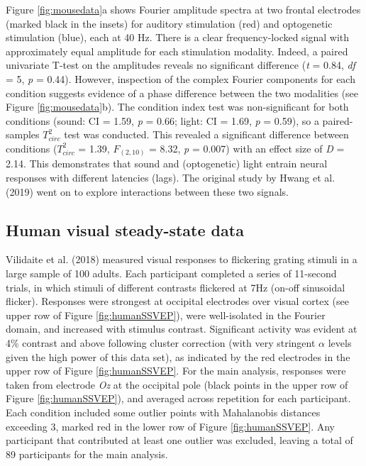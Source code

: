 \documentclass[]{article}
\begin{document}
Figure \ref{fig:mousedata}a shows Fourier amplitude spectra at two frontal electrodes (marked black in the insets) for auditory stimulation (red) and optogenetic stimulation (blue), each at 40 Hz. There is a clear frequency-locked signal with approximately equal amplitude for each stimulation modality. Indeed, a paired univariate T-test on the amplitudes reveals no significant difference (\emph{t} = 0.84, \emph{df} = 5, \emph{p} = 0.44). However, inspection of the complex Fourier components for each condition suggests evidence of a phase difference between the two modalities (see Figure \ref{fig:mousedata}b). The condition index test was non-significant for both conditions (sound: CI = 1.59, \emph{p} = 0.66; light: CI = 1.69, \emph{p} = 0.59), so a paired-samples \(T^2_{circ}\) test was conducted. This revealed a significant difference between conditions (\(T^2_{circ}\) = 1.39, \(F_{(2,10)}\) = 8.32, \emph{p} = 0.007) with an effect size of \emph{D} = 2.14. This demonstrates that sound and (optogenetic) light entrain neural responses with different latencies (lags). The original study by Hwang et al. (2019) went on to explore interactions between these two signals.

\hypertarget{human-visual-steady-state-data}{%
\subsection{Human visual steady-state data}\label{human-visual-steady-state-data}}

Vilidaite et al. (2018) measured visual responses to flickering grating stimuli in a large sample of 100 adults. Each participant completed a series of 11-second trials, in which stimuli of different contrasts flickered at 7Hz (on-off sinusoidal flicker). Responses were strongest at occipital electrodes over visual cortex (see upper row of Figure \ref{fig:humanSSVEP}), were well-isolated in the Fourier domain, and increased with stimulus contrast. Significant activity was evident at 4\% contrast and above following cluster correction (with very stringent \(\alpha\) levels given the high power of this data set), as indicated by the red electrodes in the upper row of Figure \ref{fig:humanSSVEP}. For the main analysis, responses were taken from electrode \emph{Oz} at the occipital pole (black points in the upper row of Figure \ref{fig:humanSSVEP}), and averaged across repetition for each participant. Each condition included some outlier points with Mahalanobis distances exceeding 3, marked red in the lower row of Figure \ref{fig:humanSSVEP}. Any participant that contributed at least one outlier was excluded, leaving a total of 89 participants for the main analysis.
\end{document}
